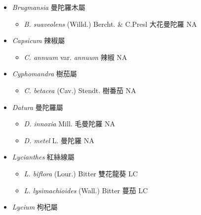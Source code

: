 
  \begin{itemize}
 \item[] \textit{Brugmansia} 曼陀羅木屬
                                
  \begin{itemize}
        \item[] \textit{B. suaveolens} (Willd.) Bercht. \& C.Presl  大花曼陀羅   NA
  \end{itemize}
 \item[] \textit{Capsicum} 辣椒屬
                                
  \begin{itemize}
        \item[] \textit{C. annuum} var. \textit{annuum}   辣椒   NA
  \end{itemize}
 \item[] \textit{Cyphomandra} 樹茄屬
                                
  \begin{itemize}
        \item[] \textit{C. betacea} (Cav.) Stendt.  樹番茄   NA
  \end{itemize}
 \item[] \textit{Datura} 曼陀羅屬
                                
  \begin{itemize}
        \item[] \textit{D. innoxia} Mill.  毛曼陀羅   NA
        \item[] \textit{D. metel} L.  曼陀羅   NA
  \end{itemize}
 \item[] \textit{Lycianthes} 紅絲線屬
                                
  \begin{itemize}
        \item[] \textit{L. biflora} (Lour.) Bitter  雙花龍葵   LC
        \item[] \textit{L. lysimachioides} (Wall.) Bitter  蔓茄   LC
  \end{itemize}
 \item[] \textit{Lycium} 枸杞屬
                                

\end{itemize}
